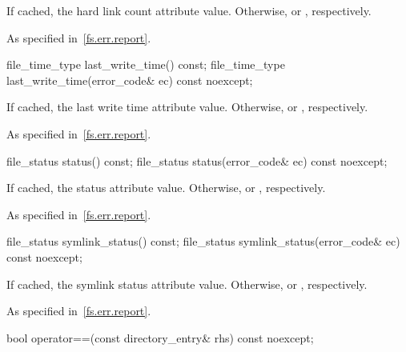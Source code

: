 \begin{itemdescr}
\pnum
\returns
If cached, the hard link count attribute value.
Otherwise,  or , respectively.

\pnum
\throws
As specified in~\ref{fs.err.report}.
\end{itemdescr}

%
\begin{itemdecl}
file_time_type last_write_time() const;
file_time_type last_write_time(error_code& ec) const noexcept;
\end{itemdecl}

\begin{itemdescr}
\pnum
\returns
If cached, the last write time attribute value.
Otherwise,  or , respectively.

\pnum
\throws
As specified in~\ref{fs.err.report}.
\end{itemdescr}

%
\begin{itemdecl}
file_status status() const;
file_status status(error_code& ec) const noexcept;
\end{itemdecl}

\begin{itemdescr}
\pnum
\returns
If cached, the status attribute value.
Otherwise,  or , respectively.

\pnum
\throws
As specified in~\ref{fs.err.report}.
\end{itemdescr}

%
\begin{itemdecl}
file_status symlink_status() const;
file_status symlink_status(error_code& ec) const noexcept;
\end{itemdecl}

\begin{itemdescr}
\pnum
\returns
If cached, the symlink status attribute value.
Otherwise,  or , respectively.

\pnum
\throws
As specified in~\ref{fs.err.report}.
\end{itemdescr}

%
\begin{itemdecl}
bool operator==(const directory_entry& rhs) const noexcept;
\end{itemdecl}

